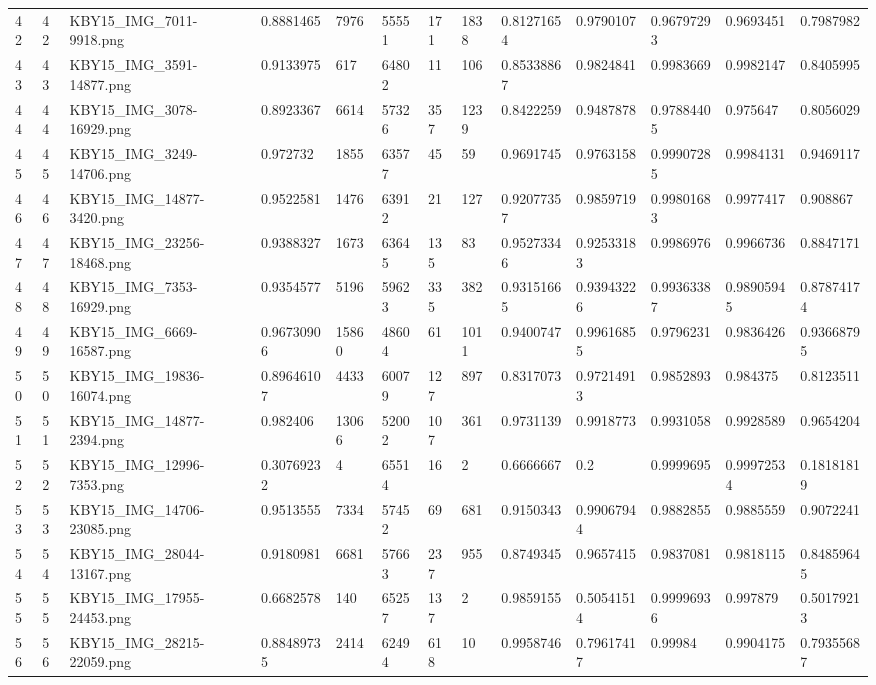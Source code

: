 \documentclass[11pt, a4paper, twoside]{report}
\begin{document}
\begin{longtable}[c]{@{}lllllllllllll@{}}
42 & 42 & KBY15\_IMG\_7011-9918.png & 0.8881465 & 7976 & 55551 & 171 & 1838 & 0.81271654 & 0.9790107 & 0.96797293 & 0.9693451 & 0.7987982 \\
43 & 43 & KBY15\_IMG\_3591-14877.png & 0.9133975 & 617 & 64802 & 11 & 106 & 0.85338867 & 0.9824841 & 0.9983669 & 0.9982147 & 0.8405995 \\
44 & 44 & KBY15\_IMG\_3078-16929.png & 0.8923367 & 6614 & 57326 & 357 & 1239 & 0.8422259 & 0.9487878 & 0.97884405 & 0.975647 & 0.8056029 \\
45 & 45 & KBY15\_IMG\_3249-14706.png & 0.972732 & 1855 & 63577 & 45 & 59 & 0.9691745 & 0.9763158 & 0.99907285 & 0.9984131 & 0.9469117 \\
46 & 46 & KBY15\_IMG\_14877-3420.png & 0.9522581 & 1476 & 63912 & 21 & 127 & 0.92077357 & 0.9859719 & 0.99801683 & 0.9977417 & 0.908867 \\
47 & 47 & KBY15\_IMG\_23256-18468.png & 0.9388327 & 1673 & 63645 & 135 & 83 & 0.95273346 & 0.92533183 & 0.9986976 & 0.9966736 & 0.8847171 \\
48 & 48 & KBY15\_IMG\_7353-16929.png & 0.9354577 & 5196 & 59623 & 335 & 382 & 0.93151665 & 0.93943226 & 0.99363387 & 0.98905945 & 0.87874174 \\
49 & 49 & KBY15\_IMG\_6669-16587.png & 0.96730906 & 15860 & 48604 & 61 & 1011 & 0.9400747 & 0.99616855 & 0.9796231 & 0.9836426 & 0.93668795 \\
50 & 50 & KBY15\_IMG\_19836-16074.png & 0.89646107 & 4433 & 60079 & 127 & 897 & 0.8317073 & 0.97214913 & 0.9852893 & 0.984375 & 0.8123511 \\
51 & 51 & KBY15\_IMG\_14877-2394.png & 0.982406 & 13066 & 52002 & 107 & 361 & 0.9731139 & 0.9918773 & 0.9931058 & 0.9928589 & 0.9654204 \\
52 & 52 & KBY15\_IMG\_12996-7353.png & 0.30769232 & 4 & 65514 & 16 & 2 & 0.6666667 & 0.2 & 0.9999695 & 0.99972534 & 0.18181819 \\
53 & 53 & KBY15\_IMG\_14706-23085.png & 0.9513555 & 7334 & 57452 & 69 & 681 & 0.9150343 & 0.99067944 & 0.9882855 & 0.9885559 & 0.9072241 \\
54 & 54 & KBY15\_IMG\_28044-13167.png & 0.9180981 & 6681 & 57663 & 237 & 955 & 0.8749345 & 0.9657415 & 0.9837081 & 0.9818115 & 0.84859645 \\
55 & 55 & KBY15\_IMG\_17955-24453.png & 0.6682578 & 140 & 65257 & 137 & 2 & 0.9859155 & 0.50541514 & 0.99996936 & 0.997879 & 0.50179213 \\
56 & 56 & KBY15\_IMG\_28215-22059.png & 0.88489735 & 2414 & 62494 & 618 & 10 & 0.9958746 & 0.79617417 & 0.99984 & 0.9904175 & 0.79355687 \\

\end{longtable}
\end{document}
